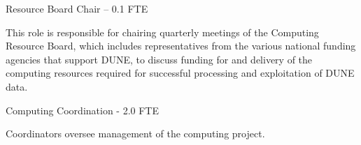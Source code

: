 \documentclass[../main-v1.tex]{subfiles}
\begin{document}
\begin{description}
\item {Resource Board Chair -- 0.1 FTE}

This role is responsible for chairing quarterly meetings of the Computing Resource Board, which includes representatives from the %
various national funding agencies that support DUNE, to discuss %
funding for and delivery of the computing resources required for successful processing and exploitation of DUNE data. %

\item {Computing Coordination - 2.0 FTE}

Coordinators oversee management of the computing project. 
\end{description}







\end{document}
